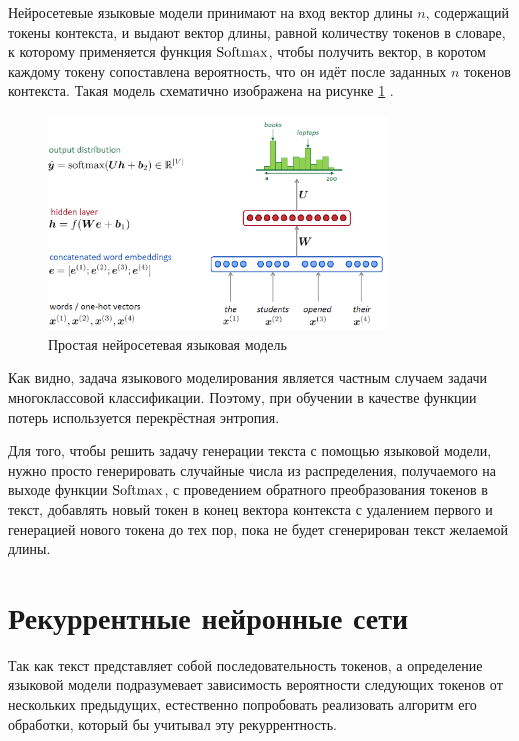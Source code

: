 Нейросетевые языковые модели принимают на вход вектор длины $n$, содержащий токены контекста, и выдают вектор длины, равной количеству токенов в словаре, к которому применяется функция $\operatorname{Softmax}$, чтобы получить вектор, в коротом каждому токену сопоставлена вероятность, что он идёт после заданных $n$ токенов контекста. Такая модель схематично изображена на рисунке \ref*{fig:lang_model} \cite{art:lang_models}.

\begin{figure}
    \centering
    \includegraphics[width=0.8\textwidth]{../inc/images/language_model.png}
    \caption{Простая нейросетевая языковая модель}
    \label{fig:lang_model}
\end{figure}

Как видно, задача языкового моделирования является частным случаем задачи многоклассовой классификации. Поэтому, при обучении в качестве функции потерь используется перекрёстная энтропия.

Для того, чтобы решить задачу генерации текста с помощью языковой модели, нужно просто генерировать случайные числа из распределения, получаемого на выходе функции $\operatorname{Softmax}$, с проведением обратного преобразования токенов в текст, добавлять новый токен в конец вектора контекста с удалением первого и генерацией нового токена до тех пор, пока не будет сгенерирован текст желаемой длины.

\section{Рекуррентные нейронные сети}

Так как текст представляет собой последовательность токенов, а определение языковой модели подразумевает зависимость вероятности следующих токенов от нескольких предыдущих, естественно попробовать реализовать алгоритм его обработки, который бы учитывал эту рекуррентность.

